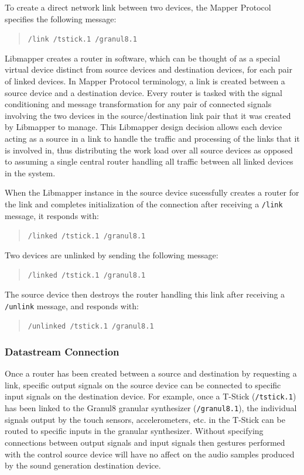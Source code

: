 To create a direct network link between two devices, the Mapper Protocol specifies the following message:

\begin{quote}
\verb#/link /tstick.1 /granul8.1#
\end{quote}

Libmapper creates a router in software, which can be thought of as a special virtual device distinct from source devices and destination devices, for each pair of linked devices. In Mapper Protocol terminology, a link is created between a source device and a destination device. Every router is tasked with the signal conditioning and message transformation for any pair of connected signals involving the two devices in the source/destination link pair that it was created by Libmapper to manage. This Libmapper design decision allows each device acting as a source in a link to handle the traffic and processing of the links that it is involved in, thus distributing the work load over all source devices as opposed to assuming a single central router handling all traffic between all linked devices in the system.

When the Libmapper instance in the source device sucessfully creates a router for the link and completes initialization of the connection after receiving a \verb#/link# message, it responds with:

\begin{quote}
\verb#/linked /tstick.1 /granul8.1#
\end{quote}

Two devices are unlinked by sending the following message:

\begin{quote}
\verb#/linked /tstick.1 /granul8.1#
\end{quote}

The source device then destroys the router handling this link after receiving a \verb#/unlink# message, and responds with:

\begin{quote}
\verb#/unlinked /tstick.1 /granul8.1#
\end{quote}

\subsubsection{Datastream Connection}

Once a router has been created between a source and destination by requesting a link, specific output signals on the source device can be connected to specific input signals on the destination device. For example, once a T-Stick (\verb#/tstick.1#) has been linked to the Granul8 granular synthesizer (\verb#/granul8.1#), the individual signals output by the touch sensors, accelerometers, etc. in the T-Stick can be routed to specific inputs in the granular synthesizer. Without specifying connections between output signals and input signals then gestures performed with the control source device will have no affect on the audio samples produced by the sound generation destination device. 

